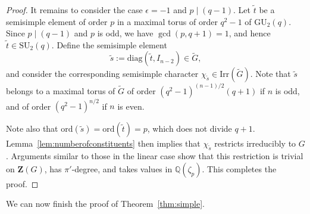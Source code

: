 \documentclass[12pt]{amsart}
\theoremstyle{definition}
\numberwithin{equation}{section}
\newcommand{\GU}{{\mathrm {GU}}}
\newcommand{\SU}{{\mathrm {SU}}}
\newcommand{\Irr}{{\mathrm {Irr}}}
\newcommand{\ord}{{\mathrm {ord}}}
\newcommand{\diag}{{\mathrm {diag}}}
\newcommand{\QQ}{{\mathbb Q}}
\newcommand{\bZ}{{\mathbf{Z}}}
\begin{document}
\begin{proof}
It remains to consider the case $\epsilon=-1$ %
and $p \mid (q-1)$.
Let \(\widetilde{t}\) be a semisimple element of order \(p\) in a
maximal torus of order $q^2-1$ of \(\GU_2(q)\). Since \(p \mid
(q-1)\) and \(p\) is odd, we have \(\gcd(p,q+1)=1\), and hence
\(\widetilde{t}\in \SU_2(q)\). Define the semisimple element
\[
\widetilde{s}:=\diag\left(\widetilde{t}, I_{n-2}\right)\in
\widetilde{G},
\]
and consider the corresponding semisimple character
\(\chi_{\widetilde{s}}\in \Irr(\widetilde{G})\). Note that
$\widetilde{s}$ belongs to a maximal torus of $\widetilde{G}$ of
order $(q^2-1)^{(n-1)/2}(q+1)$ if $n$ is odd, and of %
order
$(q^2-1)^{n/2}$ if $n$ is even.

Note %
also that \(\ord(\widetilde{s})=\ord(\widetilde{t})=p\), which
does not divide $q+1$. Lemma~\ref{lem:numberofconstituents} then
implies that \(\chi_{\widetilde{s}}\) restricts irreducibly to
\(G\). Arguments similar to those in the linear case show that this
restriction is trivial on \(\bZ(G)\), has \(\pi'\)-degree, and takes
values in \(\QQ(\zeta_p)\). This completes the proof.
\end{proof}


We can now finish the proof of Theorem~\ref{thm:simple}.
\end{document}
